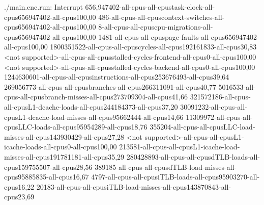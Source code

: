 ./main.enc.run: Interrupt
656,947402-all-cpus-all-cpustask-clock-all-cpus656947402-all-cpus100,00
486-all-cpus-all-cpuscontext-switches-all-cpus656947402-all-cpus100,00
8-all-cpus-all-cpuscpu-migrations-all-cpus656947402-all-cpus100,00
1481-all-cpus-all-cpuspage-faults-all-cpus656947402-all-cpus100,00
1800351522-all-cpus-all-cpuscycles-all-cpus192161833-all-cpus30,83
<not supported>-all-cpus-all-cpusstalled-cycles-frontend-all-cpus0-all-cpus100,00
<not supported>-all-cpus-all-cpusstalled-cycles-backend-all-cpus0-all-cpus100,00
1244630601-all-cpus-all-cpusinstructions-all-cpus253676493-all-cpus39,64
269056773-all-cpus-all-cpusbranches-all-cpus266311091-all-cpus40,77
5016533-all-cpus-all-cpusbranch-misses-all-cpus273709304-all-cpus41,66
321572186-all-cpus-all-cpusL1-dcache-loads-all-cpus244184373-all-cpus37,20
30091232-all-cpus-all-cpusL1-dcache-load-misses-all-cpus95662444-all-cpus14,66
11309972-all-cpus-all-cpusLLC-loads-all-cpus95954289-all-cpus18,76
355204-all-cpus-all-cpusLLC-load-misses-all-cpus143930429-all-cpus27,28
<not supported>-all-cpus-all-cpusL1-icache-loads-all-cpus0-all-cpus100,00
213581-all-cpus-all-cpusL1-icache-load-misses-all-cpus191781181-all-cpus35,29
280428893-all-cpus-all-cpusdTLB-loads-all-cpus159755507-all-cpus28,56
389185-all-cpus-all-cpusdTLB-load-misses-all-cpus95885835-all-cpus16,67
4797-all-cpus-all-cpusiTLB-loads-all-cpus95903270-all-cpus16,22
20183-all-cpus-all-cpusiTLB-load-misses-all-cpus143870843-all-cpus23,69
